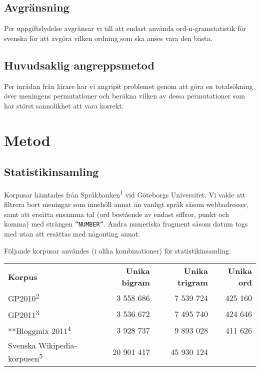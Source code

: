 \documentclass[a4paper,11pt]{article}
\begin{document}
\subsection*{Avgränsning}
Per uppgiftslydelse avgränsar vi till att endast använda ord-n-gramstatistik
för svenska för att avgöra vilken ordning som ska anses vara den bästa.

\subsection*{Huvudsaklig angreppsmetod}
Per inrådan från lärare har vi angripit problemet genom att göra en
totalsökning över meningens permutationer och beräkna vilken av dessa
permutationer som har störst sannolikhet att vara korrekt.

\section*{Metod}
\subsection*{Statistikinsamling}
Korpusar hämtades från Språkbanken\textsuperscript{1} vid Göteborgs
Universitet. Vi valde att filtrera bort meningar som innehöll annat än
vanligt språk såsom webbadresser, samt att ersätta ensamma tal (ord
bestående av endast siffror, punkt och komma) med strängen
\texttt{''NUMBER''}. Andra numeriska fragment såsom datum togs med
utan att ersättas med någonting annat.

\vspace{0.25cm}
\noindent
Följande korpusar användes (i olika kombinationer) för statistikinsamling:

\vspace{0.25cm}

\begin{center}
\begin{tabular}{l r r r}
\textbf{Korpus}            & \textbf{Unika bigram}   & \textbf{Unika trigram}   &  \textbf{Unika ord} \\
GP2010\textsuperscript{2}                     & 3 558 686                 & 7 539 724                  & 425 160\\
GP2011\textsuperscript{3}                     & 3 536 672                 & 7 495 740                  & 424 646\\
**Bloggmix 2011\textsuperscript{4}              & 3 928 737                 & 9 893 028                  & 411 626\\
Svenska Wikipedia-korpusen\textsuperscript{5} & 20 901 417                & 45 930 124 
\end{tabular}
\end{center}
\end{document}
